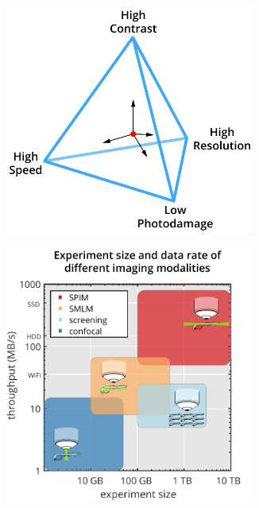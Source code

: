 \documentclass{booklet_style}
\begin{document}
\begin{figure}[bht]
  \centering
  \begin{subfigure}[b]{0.49\textwidth}
    \raggedright
    \includegraphics[width=0.9\textwidth]{1_spim/tradeoffs}
    \caption{}
    \label{fig:tradeoffs}
  \end{subfigure}
  \begin{subfigure}[b]{0.49\textwidth}
    \raggedleft
    \includegraphics[width=0.9\textwidth]{4_gpu/comparison_with_pictograms}

\end{subfigure}
\end{figure}
\end{document}
